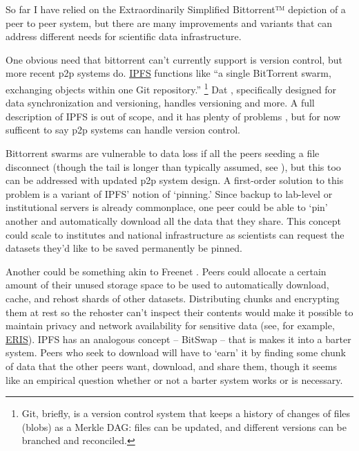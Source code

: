 \documentclass[10pt]{article}
\begin{document}
\begin{multicols}{2}
So far I have relied on the Extraordinarily Simplified Bittorrent™️
depiction of a peer to peer system, but there are many improvements and
variants that can address different needs for scientific data
infrastructure.

One obvious need that bittorrent can't currently support is version
control, but more recent p2p systems do. \href{https://ipfs.io/}{IPFS}
functions like ``a single BitTorrent swarm, exchanging objects within
one Git repository.'' \cite{benetIPFSContentAddressed2014} \footnote{Git, briefly, is a version control system that keeps a
  history of changes of files (blobs) as a Merkle DAG: files can be
  updated, and different versions can be branched and reconciled.} Dat
\cite{ogdenDatDistributedDataset2017} , specifically designed for
data synchronization and versioning, handles versioning and more. A full
description of IPFS is out of scope, and it has plenty of problems \cite{patsakisHydrasIPFSDecentralised2019} , but for now sufficent to
say p2p systems can handle version control.

Bittorrent swarms are vulnerable to data loss if all the peers seeding a
file disconnect (though the tail is longer than typically assumed, see
\cite{zhangUnravelingBitTorrentEcosystem2011} ), but this too can
be addressed with updated p2p system design. A first-order solution to
this problem is a variant of IPFS' notion of `pinning.' Since backup to
lab-level or institutional servers is already commonplace, one peer
could be able to `pin' another and automatically download all the data
that they share. This concept could scale to institutes and national
infrastructure as scientists can request the datasets they'd like to be
saved permanently be pinned.

Another could be something akin to Freenet \cite{clarkeFreenetDistributedAnonymous2001} . Peers could allocate a
certain amount of their unused storage space to be used to automatically
download, cache, and rehost shards of other datasets. Distributing
chunks and encrypting them at rest so the rehoster can't inspect their
contents would make it possible to maintain privacy and network
availability for sensitive data (see, for example,
\href{https://inqlab.net/projects/eris/}{ERIS}). IPFS has an analogous
concept -- BitSwap -- that is makes it into a barter system. Peers who
seek to download will have to `earn' it by finding some chunk of data
that the other peers want, download, and share them, though it seems
like an empirical question whether or not a barter system works or is
necessary.


\end{multicols}
\end{document}
